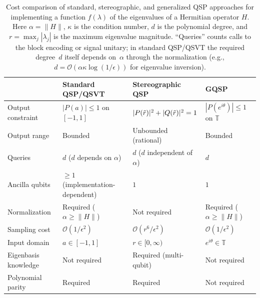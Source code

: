 \begin{table}[t]
	\caption{Cost comparison of standard, stereographic, and generalized QSP approaches for implementing a function $f(\lambda)$ of the eigenvalues of a Hermitian operator $H$. Here $\alpha = \|H\|$, $\kappa$ is the condition number, $d$ is the polynomial degree, and $r = \max_j |\lambda_j|$ is the maximum eigenvalue magnitude.  ``Queries'' counts calls to the block encoding or signal unitary; in standard QSP/QSVT the required degree~$d$ itself depends on~$\alpha$ through the normalization (e.g., $d = \mathcal{O}(\alpha\kappa\log(1/\epsilon))$ for eigenvalue inversion).}
	\label{tab:cost-comparison}
	\begin{ruledtabular}
		\begin{tabular}{llll}
			                     & Standard QSP/QSVT                   & Stereographic QSP                     & GQSP~\cite{MotlaghWiebe2023}              \\
			\hline
			Output constraint    & $|P(a)| \leq 1$ on $[-1,1]$         & $|P(\tilde{r})|^2 + |Q(\tilde{r})|^2 = 1$ & $|P(e^{i\theta})| \leq 1$ on $\mathbb{T}$ \\
			Output range         & Bounded                             & Unbounded (rational)                  & Bounded                                   \\
			Queries              & $d$ ($d$ depends on $\alpha$)        & $d$ ($d$ independent of $\alpha$)     & $d$                                       \\
			Ancilla qubits       & $\geq 1$ (implementation-dependent) & $1$                                   & $1$                                       \\
			Normalization        & Required ($\alpha \geq \|H\|$)      & Not required                          & Required ($\alpha \geq \|H\|$)            \\
			Sampling cost        & $\mathcal{O}(1/\epsilon^2)$         & $\mathcal{O}(r^6/\epsilon^2)$         & $\mathcal{O}(1/\epsilon^2)$               \\
			Input domain         & $a \in [-1,1]$                      & $r \in [0,\infty)$                    & $e^{i\theta} \in \mathbb{T}$              \\
			Eigenbasis knowledge & Not required                        & Required (multi-qubit)                & Not required                              \\
			Polynomial parity    & Required                            & Required                              & Not required                              \\
		\end{tabular}
	\end{ruledtabular}
\end{table}

